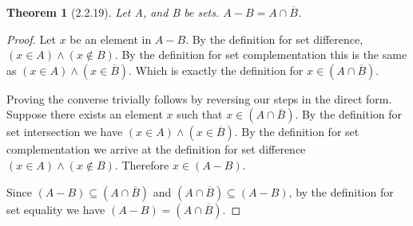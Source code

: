 \documentclass[a4paper, 12pt]{article}
\theoremstyle{plain}
\newtheorem*{theorem*}{Theorem}
\begin{document}
	
	\begin{theorem*}[2.2.19]
		Let A, and B be sets. $A - B = A \cap \overline{B}$.
	\end{theorem*}
	
	\begin{proof}
		Let $x$ be an element in $A - B$. By the definition for set difference, $(x \in A) \land (x \notin B)$. By the definition for set complementation this is the same as $(x \in A) \land (x \in \overline{B})$. Which is exactly the definition for $x \in (A \cap \overline{B})$.
		
		Proving the converse trivially follows by reversing our steps in the direct form. Suppose there exists an element $x$ such that $x \in (A \cap \overline{B})$. By the definition for set intersection we have $(x \in A) \land (x \in \overline{B})$. By the definition for set complementation we arrive at the definition for set difference \newline $(x \in A) \land (x \notin B)$. Therefore $x \in (A - B)$.
		
		Since $(A - B) \subseteq (A \cap \overline{B})$ and $(A \cap \overline{B}) \subseteq (A - B)$, by the definition for set equality we have $(A - B) = (A \cap \overline{B})$.
	\end{proof}
\end{document}
